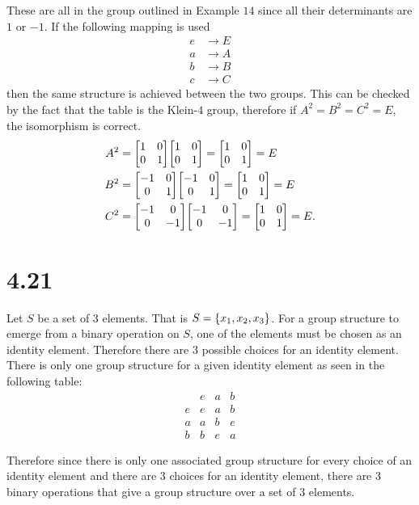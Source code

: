 \documentclass[12pt]{extarticle}
\begin{document}
These are all in the group outlined in Example $14$ since all their determinants are $1$ or $-1$. If the following mapping is used
\begin{align*}
	e &\to E \\
	a &\to A \\
	b &\to B \\
	c &\to C
\end{align*}
then the same structure is achieved between the two groups. This can be checked by the fact that the table is the Klein-$4$ group, therefore if $A^2 = B^2 = C^2 = E$, the isomorphism is correct.
\begin{align*}
	A^2 &= \mqty[1 & 0 \\ 0 & 1] \mqty[1 & 0 \\ 0 & 1] = \mqty[1 & 0 \\ 0 & 1] = E \\
	B^2 &= \mqty[-1 & 0 \\ 0 & 1] \mqty[-1 & 0 \\ 0 & 1] = \mqty[1 & 0 \\ 0 & 1] = E \\
	C^2 &= \mqty[-1 & 0 \\ 0 & -1] \mqty[-1 & 0 \\ 0 & -1] = \mqty[1 & 0 \\ 0 & 1] = E
.\end{align*}

\section*{4.21}
Let $S$ be a set of $3$ elements. That is $S = \qty{x_1, x_2, x_3}$. For a group structure to emerge from a binary operation on $S$, one of the elements must be chosen as an identity element. Therefore there are $3$ possible choices for an identity element. There is only one group structure for a given identity element as seen in the following table:
\[
	\begin{array}{c|c|c|c}
		   & e & a & b \\\hline 
		 e & e & a & b \\\hline 
		 a & a & b & e \\\hline 
		 b & b & e & a 
	\end{array}
\]

Therefore since there is only one associated group structure for every choice of an identity element and there are $3$ choices for an identity element, there are $3$ binary operations that give a group structure over a set of $3$ elements.
\end{document}
